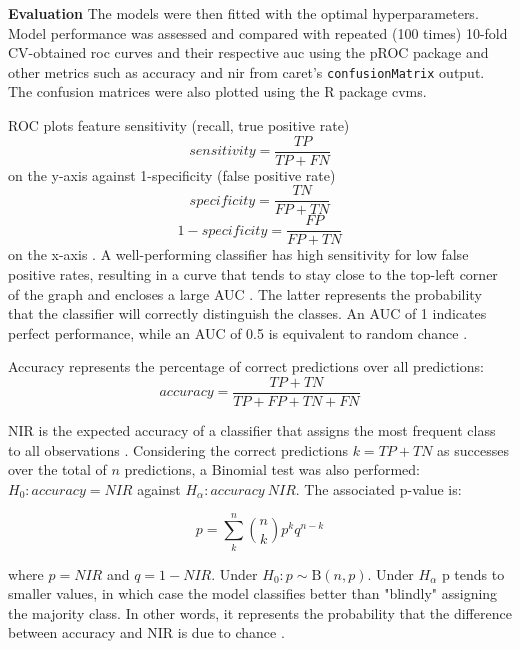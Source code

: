 \documentclass{amsart}
\begin{document}
\leavevmode\newline \textbf{Evaluation}\hspace{.25cm} The models were then fitted with the optimal hyperparameters. Model performance was assessed and compared with repeated (100 times) 10-fold CV-obtained \acrfull{roc} curves and their respective \acrfull{auc} using the \textsf{pROC} package \cite{pROC} and other metrics such as accuracy and \acrfull{nir} from \textsf{caret}'s \texttt{confusionMatrix} output. The confusion matrices were also plotted using the R package \textsf{cvms}.

ROC plots feature sensitivity (recall, true positive rate) \[ sensitivity = \frac{TP}{TP+FN}\] on the y-axis against 1-specificity (false positive rate) 
\[ specificity = \frac{TN}{FP+TN}\]
\[ 1-specificity = \frac{FP}{FP+TN}\] on the x-axis \cite{James2023AnEdition}.
A well-performing classifier has high sensitivity for low false positive rates, resulting in a curve that tends to stay close to the top-left corner of the graph and encloses a large AUC \cite{James2023AnEdition}. The latter represents the probability that the classifier will correctly distinguish the classes. An AUC of 1 indicates perfect performance, while an AUC of 0.5 is equivalent to random chance \cite{James2023AnEdition}. 

Accuracy represents the percentage of correct predictions over all predictions: 
\[ accuracy = \frac{TP+TN}{TP+FP+TN+FN}\]

NIR is the expected accuracy of a classifier that assigns the most frequent class to all observations \cite{Kuhn2008BuildingPackage}. Considering the correct predictions $k =TP+TN$ as successes over the total of $n$ predictions, a Binomial test was also performed: $H_0: accuracy = NIR$ against $H_\alpha: accuracy \> NIR$. The associated p-value is:

\[p = \sum_{k}^n \binom{n}{k} p^k q^{n-k}\]

where $p=NIR$ and $q=1-NIR$. Under $H_0: p \sim \mathrm{B}(n,p)$. Under $H_\alpha$ p tends to smaller values, in which case the model classifies better than "blindly" assigning the majority class. In other words, it represents the probability that the difference between accuracy and NIR is due to chance \cite{NIR2023}.
\end{document}
